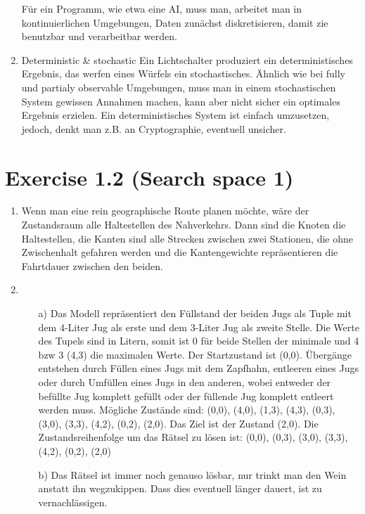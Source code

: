 \documentclass[12pt,a4paper]{article}
\begin{document}
\begin{enumerate}
        Für ein Programm, wie etwa eine AI, muss man, arbeitet man in kontinuierlichen Umgebungen,
        Daten zunächst diskretisieren, damit zie benutzbar und verarbeitbar werden.

    \item Deterministic \& stochastic
        Ein Lichtschalter produziert ein deterministisches Ergebnis, das werfen eines Würfels
        ein stochastisches. Ähnlich wie bei fully und partialy observable Umgebungen,
        muss man in einem stochastischen System gewissen Annahmen machen, kann aber nicht
        sicher ein optimales Ergebnis erzielen. Ein deterministisches System ist einfach
        umzusetzen, jedoch, denkt man z.B. an Cryptographie, eventuell unsicher.
\end{enumerate}

\section*{Exercise 1.2 (Search space 1)}

\begin{enumerate}
    \item 
        Wenn man eine rein geographische Route planen möchte, wäre der
        Zustandsraum alle Haltestellen des Nahverkehrs. Dann sind die
        Knoten die Haltestellen, die Kanten sind alle Strecken zwischen
        zwei Stationen, die ohne Zwischenhalt gefahren werden und die
        Kantengewichte repräsentieren die Fahrtdauer zwischen den beiden.

    \item 
        \begin{itemize}
            \item[a)]
                Das Modell repräsentiert den Füllstand der beiden Jugs
                als Tuple mit dem 4-Liter Jug als erste und dem 3-Liter
                Jug als zweite Stelle. Die Werte des Tupels sind in Litern,
                somit ist 0 für beide Stellen der minimale und 4 bzw 3 (4,3)
                die maximalen Werte. Der Startzustand ist (0,0).
                Übergänge entstehen durch Füllen eines Jugs mit dem Zapfhahn,
                entleeren eines Jugs oder durch Umfüllen eines Jugs in den anderen,
                wobei entweder der befüllte Jug komplett gefüllt oder der
                füllende Jug komplett entleert werden muss.
                Mögliche Zustände sind:
                (0,0), (4,0), (1,3), (4,3), (0,3), (3,0), (3,3), (4,2), (0,2), (2,0).
                Das Ziel ist der Zustand (2,0).
                Die Zustandsreihenfolge um das Rätsel zu lösen ist:
                (0,0), (0,3), (3,0), (3,3), (4,2), (0,2), (2,0)
            \item[b)]
                Das Rätsel ist immer noch genauso lösbar, nur trinkt man den Wein
                anstatt ihn wegzukippen. Dass dies eventuell länger dauert, ist zu vernachlässigen.
        \end{itemize}

\end{enumerate}
\end{document}
